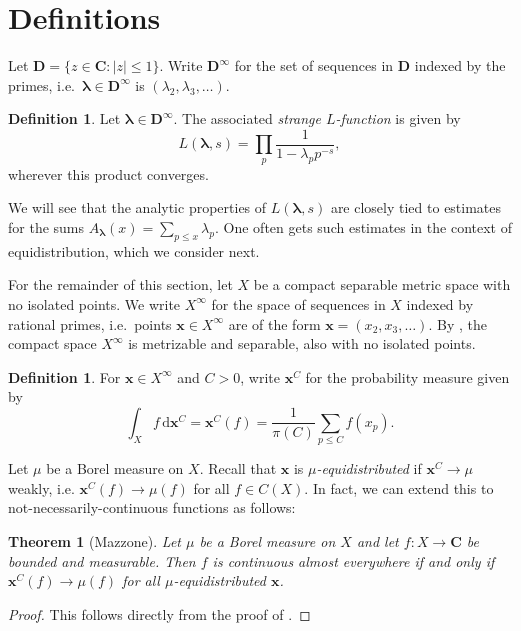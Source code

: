 \documentclass{article}
\newcommand{\bC}{\mathbf{C}}
\newcommand{\bD}{\mathbf{D}}
\newcommand{\blambda}{{\boldsymbol{\lambda}}}
\newcommand{\bx}{\boldsymbol{x}}
\newcommand{\dd}{\mathrm{d}}
\newtheorem{theorem}[subsection]{Theorem}
\theoremstyle{definition}
\newtheorem{definition}[subsection]{Definition}
\begin{document}
\section{Definitions}\label{sec:definition}

Let $\bD=\{z\in \bC : |z|\leqslant 1\}$. Write $\bD^\infty$ for the set of 
sequences in $\bD$ indexed by the primes, i.e.~$\blambda\in\bD^\infty$ is 
$(\lambda_2,\lambda_3,\dots)$. 

\begin{definition}
Let $\blambda\in\bD^\infty$. The associated \emph{strange $L$-function} is 
given by 
\[
	L(\blambda,s) = \prod_p \frac{1}{1-\lambda_p p^{-s}} ,
\]
wherever this product converges. 
\end{definition}

We will see that the analytic properties of $L(\blambda,s)$ are closely tied to 
estimates for the sums $A_\blambda(x) = \sum_{p\leqslant x} \lambda_p$. One 
often gets such estimates in the context of equidistribution, which we consider 
next.

For the remainder of this section, let $X$ be a compact separable metric space with no 
isolated points. We write $X^\infty$ for the space of sequences in $X$ indexed 
by rational primes, i.e.~points $\bx\in X^\infty$ are of the form 
$\bx=(x_2,x_3,\dots)$. By \cite[Cor.~2.3.16 \& Th.~4.2.2]{engelking-1989}, the 
compact space $X^\infty$ is metrizable and separable, also with no isolated 
points. 

\begin{definition}
For $\bx\in X^\infty$ and $C>0$, write $\bx^C$ for the probability measure 
given by 
\[
	\int_X f\, \dd \bx^C = \bx^C(f) = \frac{1}{\pi(C)} \sum_{p\leqslant C} f(x_p) .
\]
\end{definition}

Let $\mu$ be a Borel measure on $X$. Recall that $\bx$ is 
\emph{$\mu$-equidistributed} if $\bx^C\to \mu$ weakly, i.e. 
$\bx^C(f) \to \mu(f)$ for all $f\in C(X)$. In fact, we can extend this to 
not-necessarily-continuous functions as follows:

\begin{theorem}[Mazzone]
Let $\mu$ be a Borel measure on $X$ and let $f\colon X\to \bC$ be bounded and 
measurable. Then $f$ is continuous almost everywhere if and only if 
$\bx^C(f) \to \mu(f)$ for all $\mu$-equidistributed $\bx$. 
\end{theorem}
\begin{proof}
This follows directly from the proof of \cite[Th.~1]{mazzone-1995}.
\end{proof}
\end{document}
